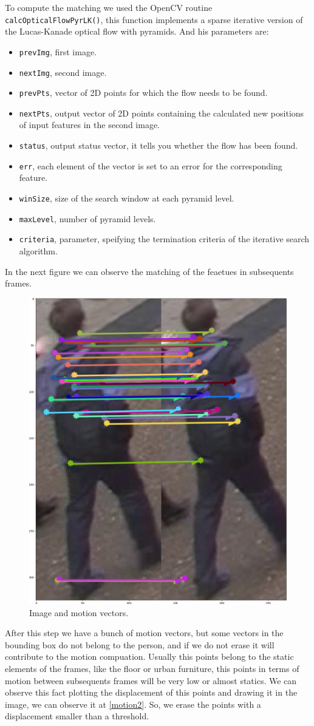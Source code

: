 \documentclass[12pt, a4paper, titlepage,twoside,openright]{article}
\begin{document}
To compute the matching we used the OpenCV routine \texttt{calcOpticalFlowPyrLK()}, this function implements a sparse iterative version of the Lucas-Kanade optical flow with pyramids. And his parameters are:
 
\begin{itemize}

\item \texttt{prevImg}, first image.
\item \texttt{nextImg}, second image.
\item \texttt{prevPts}, vector of 2D points for which the flow needs to be found. 
\item \texttt{nextPts}, output vector of 2D points containing the calculated new positions of input features in the second image. 
\item \texttt{status}, output status vector, it tells you whether the flow has been found.  
\item \texttt{err}, each element of the vector is set to an error for the corresponding feature.
\item \texttt{winSize}, size of the search window at each pyramid level. 
\item \texttt{maxLevel}, number of pyramid levels.  
\item \texttt{criteria}, parameter, speifying the termination criteria of the iterative search algorithm.
\end{itemize}


In the next figure we can observe the matching of the feaetues in subsequents frames.

\begin{figure}[hptb]
\centering         
\includegraphics[width=0.3\linewidth]{implementation/matching.png}
\caption{Image and motion vectors.} \label{motion1}
\end{figure}


After this step we have a bunch of motion vectors, but some vectors in the bounding box do not belong to the person, and if we do not erase it will contribute to the motion compuation. Usually this points belong to the static elements of the frames, like the floor or urban furniture, this points in terms of motion between subsequents frames will be very low or almost statics. We can observe this fact plotting the displacement of this points and drawing it in the image, we can observe it at \ref{motion2}. So, we erase the points with a displacement smaller than a threshold. 
\end{document}
